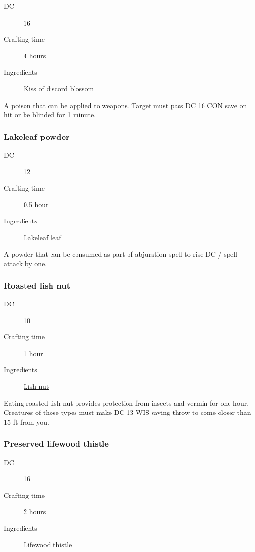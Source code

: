 \begin{description}
\item [DC] 16
\item [Crafting time] 4 hours
\item [Ingredients] \hyperref[Kiss of Discord]{Kiss of discord blossom}
\end{description}

A poison that can be applied to weapons. Target must pass DC 16 CON save on hit or be blinded for 1 minute.

\subsubsection{Lakeleaf powder}
\label{Lakeleaf powder}

\begin{description}
\item [DC] 12
\item [Crafting time] 0.5 hour
\item [Ingredients] \hyperref[Lakeleaf]{Lakeleaf leaf}
\end{description}

A powder that can be consumed as part of abjuration spell to rise DC / spell attack by one.

\subsubsection{Roasted lish nut}
\label{Roasted lish nut}

\begin{description}
\item [DC] 10
\item [Crafting time] 1 hour
\item [Ingredients] \hyperref[Lish]{Lish nut}
\end{description}

Eating roasted lish nut provides protection from insects and vermin for one hour. 
Creatures of those types must make DC 13 WIS saving throw to come closer than 15 ft from you.

\subsubsection{Preserved lifewood thistle}
\label{Preserved lifewood thistle}

\begin{description}
\item [DC] 16
\item [Crafting time] 2 hours
\item [Ingredients] \hyperref[Lifewood]{Lifewood thistle}
\end{description}

